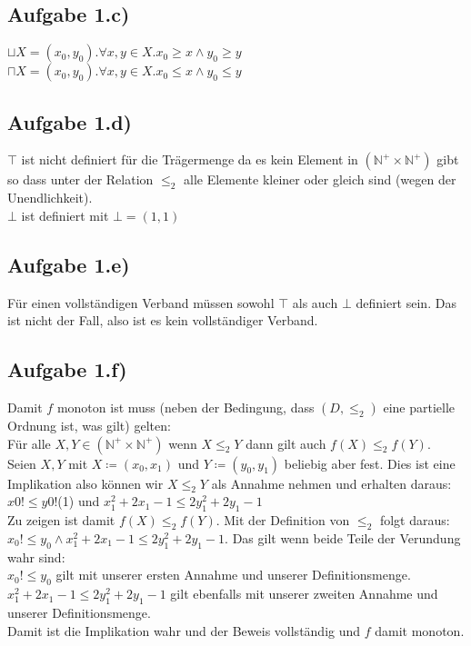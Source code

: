 \documentclass[10pt,a4paper,german,landscape,fleqn]{article} \usepackage[utf8]{inputenc} %
\begin{document}
\subsection*{Aufgabe 1.c)}

$\sqcup X = (x_0, y_0).\forall x,y \in X. x_0 \ge x \wedge y_0 \ge y$ \\
$\sqcap X = (x_0, y_0).\forall x,y \in X. x_0 \le x \wedge y_0 \le y$

\subsection*{Aufgabe 1.d)}

$\top$ ist nicht definiert für die Trägermenge da es kein Element in $(\mathbb N^{+} \times \mathbb N^{+} )$ gibt so dass unter der Relation $\le_2$ alle Elemente kleiner oder gleich sind (wegen der Unendlichkeit).\\
$\bot$ ist definiert mit $\bot = (1,1)$
\subsection*{Aufgabe 1.e)}
Für einen vollständigen Verband müssen sowohl $\top$ als auch $\bot$ definiert sein. Das ist nicht der Fall, also ist es kein vollständiger Verband.
\subsection*{Aufgabe 1.f)}
Damit $f$ monoton ist muss (neben der Bedingung, dass $(D, \le_2)$ eine partielle Ordnung ist, was gilt) gelten: \\
Für alle $X, Y \in (\mathbb N^{+} \times \mathbb N^{+} )$ wenn $X \le_2 Y$ dann gilt auch $f(X) \le_2 f(Y)$. \\
Seien $X,Y$ mit $X \coloneqq (x_0, x_1)$ und $Y \coloneqq (y_0, y_1)$ beliebig aber fest.
Dies ist eine Implikation also können wir $X \le_2 Y$ als Annahme nehmen und erhalten daraus: \\
$ x0! \le y0! $(1) und $x_1^2+2 x_1 - 1 \le 2 y_1^2 + 2 y_1 -1$ \\
Zu zeigen ist damit $f(X) \le_2 f(Y)$. Mit der Definition von $\le_2$ folgt daraus:
$x_0! \le y_0 \wedge x_1^2 + 2x_1 -1 \le 2 y_1^2 + 2 y_1 -1$. Das gilt wenn beide Teile der Verundung wahr sind: \\
$x_0! \le y_0$ gilt mit unserer ersten Annahme und unserer Definitionsmenge. \\
$x_1^2 + 2x_1 -1 \le 2 y_1^2 + 2 y_1 -1$ gilt ebenfalls mit unserer zweiten Annahme und unserer Definitionsmenge. \\
Damit ist die Implikation wahr und der Beweis vollständig und $f$ damit monoton.
\end{document}

